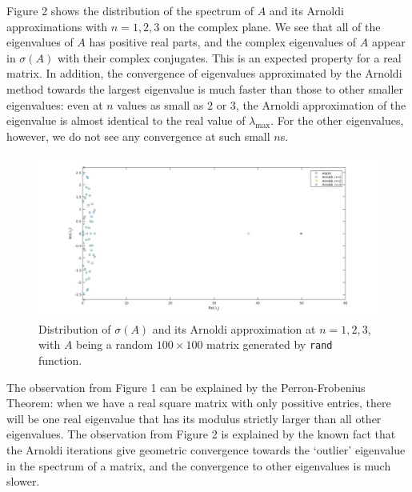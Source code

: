 \documentclass[11pt]{article}
\begin{document}
Figure 2 shows the distribution of the spectrum of $A$ and its Arnoldi approximations with $n=1,2,3$ on the complex plane. We see that all of the eigenvalues of $A$ has positive real parts, and the complex eigenvalues of $A$ appear in $\sigma(A)$ with their complex conjugates. This is an expected property for a real matrix. In addition, the convergence of eigenvalues approximated by the Arnoldi method towards the largest eigenvalue is much faster than those to other smaller eigenvalues: even at $n$ values as small as $2$ or $3$, the Arnoldi approximation of the eigenvalue is almost identical to the real value of $\lambda_{\max}$. For the other eigenvalues, however, we do not see any convergence at such small $n$s.
\begin{center}
\begin{figure}[h]
\centering
\includegraphics[width=15cm]{matlab/prob1b_uniform.jpg}
\caption{Distribution of $\sigma(A)$ and its Arnoldi approximation at $n=1,2,3$, with $A$ being a random $100\times100$ matrix generated by \texttt{rand} function.}
\end{figure}
\end{center}
The observation from Figure 1 can be explained by the Perron-Frobenius Theorem: when we have a real square matrix with only possitive entries, there will be one real eigenvalue that has its modulus strictly larger than all other eigenvalues. The observation from Figure 2 is explained by the known fact that the Arnoldi iterations give geometric convergence towards the `outlier' eigenvalue in the spectrum of a matrix, and the convergence to other eigenvalues is much slower.
\pagebreak
\end{document}
